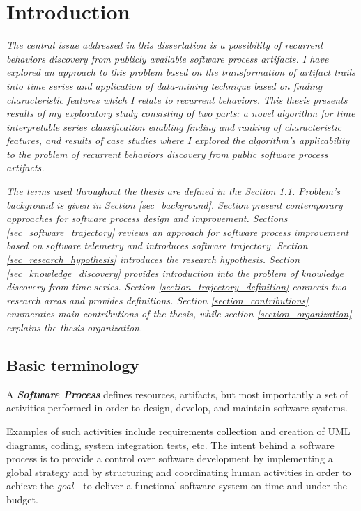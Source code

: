 \chapter{Introduction}\label{chapter_introduction}
\textit{The central issue addressed in this dissertation is a possibility of recurrent 
behaviors discovery from publicly available software process artifacts. 
I have explored an approach to this problem based on the transformation of artifact trails into 
time series and application of data-mining technique based on finding characteristic features which 
I relate to recurrent behaviors. 
This thesis presents results of my exploratory study consisting of two parts: 
a novel algorithm for time interpretable series classification enabling finding and ranking 
of characteristic features, 
and results of case studies where I explored the algorithm's applicability to the problem of 
recurrent behaviors discovery from public software process artifacts.}

\textit{The terms used throughout the thesis are defined in the Section \ref{sec_terminology}. 
Problem's background is given in Section \ref{sec_background}. 
Section \label{section_software_process_design} present contemporary approaches for software 
process design and improvement. 
Sections \ref{sec_software_trajectory} reviews an approach for software process improvement 
based on software telemetry and introduces software trajectory.
Section \ref{sec_research_hypothesis} introduces the research hypothesis.
Section \ref{sec_knowledge_discovery} provides introduction into the problem of knowledge discovery 
from time-series.
Section \ref{section_trajectory_definition} connects two research areas and provides definitions.
Section \ref{section_contributions} enumerates main contributions of the thesis, 
while section \ref{section_organization} explains the thesis organization.}

\section{Basic terminology}\label{sec_terminology}
\begin{defn}\label{def_process}
A \textbf{\textit{Software Process}} defines resources, artifacts, but most importantly a set
of activities performed in order to design, develop, and maintain software systems.
\end{defn}
Examples of such activities include requirements collection and creation of UML diagrams, 
coding, system integration tests, etc. The intent behind a software process is to provide a 
control over software development by implementing a global strategy and by structuring
and coordinating human activities in order to achieve the \textit{goal} - to deliver a functional
software system on time and under the budget. 

